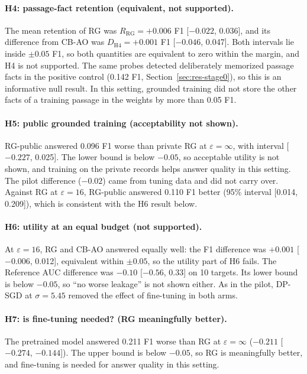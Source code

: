 \documentclass[11pt]{article}
\begin{document}
\paragraph{H4: passage-fact retention (equivalent, not supported).} The mean retention of RG was $R_{\mathrm{RG}}=+0.006$ F1 [$-0.022$, 0.036], and its difference from CB-AO was $D_{\mathrm{H4}}=+0.001$ F1 [$-0.046$, 0.047]. Both intervals lie inside $\pm0.05$ F1, so both quantities are equivalent to zero within the margin, and H4 is not supported. The same probes detected deliberately memorized passage facts in the positive control (0.142 F1, Section~\ref{sec:res-stage0}), so this is an informative null result. In this setting, grounded training did not store the other facts of a training passage in the weights by more than 0.05 F1.

\paragraph{H5: public grounded training (acceptability not shown).} RG-public answered 0.096 F1 worse than private RG at $\varepsilon=\infty$, with interval [$-0.227$, 0.025]. The lower bound is below $-0.05$, so acceptable utility is not shown, and training on the private records helps answer quality in this setting. The pilot difference ($-0.02$) came from tuning data and did not carry over. Against RG at $\varepsilon=16$, RG-public answered 0.110 F1 better (95\% interval [0.014, 0.209]), which is consistent with the H6 result below.

\paragraph{H6: utility at an equal budget (not supported).} At $\varepsilon=16$, RG and CB-AO answered equally well: the F1 difference was $+0.001$ [$-0.006$, 0.012], equivalent within $\pm0.05$, so the utility part of H6 fails. The Reference AUC difference was $-0.10$ [$-0.56$, 0.33] on 10 targets. Its lower bound is below $-0.05$, so ``no worse leakage'' is not shown either. As in the pilot, DP-SGD at $\sigma=5.45$ removed the effect of fine-tuning in both arms.

\paragraph{H7: is fine-tuning needed? (RG meaningfully better).} The pretrained model answered 0.211 F1 worse than RG at $\varepsilon=\infty$ ($-0.211$ [$-0.274$, $-0.144$]). The upper bound is below $-0.05$, so RG is meaningfully better, and fine-tuning is needed for answer quality in this setting.
\end{document}

